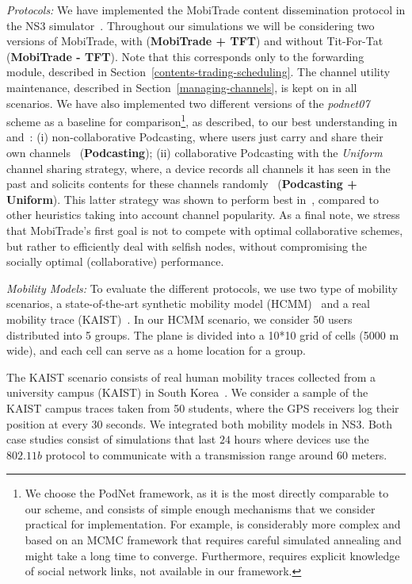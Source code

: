 \emph{Protocols:} We have implemented the MobiTrade content dissemination protocol in the NS3 simulator~\cite{NS3}. Throughout our simulations we will be considering two versions of MobiTrade, with (\textbf{MobiTrade + TFT}) and without Tit-For-Tat (\textbf{MobiTrade - TFT}). Note that this corresponds only to the forwarding module, described in Section~\ref{contents-trading-scheduling}. The channel utility maintenance, described in Section~\ref{managing-channels}, is kept on in all scenarios. We have also implemented two different versions of the \emph{podnet07} scheme as a baseline for comparison\footnote{We choose the PodNet framework, as it is the most directly comparable to our scheme, and consists of simple enough mechanisms that we consider practical for implementation. For example, \cite{OptimalChannelChoice} is considerably more complex and based on an MCMC framework that requires careful simulated annealing and might take a long time to converge. Furthermore, \cite{ContentPlace} requires explicit knowledge of social network links, not available in our framework.},  as described, to our best understanding in~\cite{May07wirelessopportunistic} and~\cite{Podcasting:Secon07}: (i) non-collaborative Podcasting, where users just carry and share their own channels~\cite{May07wirelessopportunistic} (\textbf{Podcasting}); (ii) collaborative Podcasting with the \emph{Uniform} channel sharing strategy, where, a device records all channels it has seen in the past and solicits contents for these channels randomly~\cite{Podcasting:Secon07} (\textbf{Podcasting + Uniform}). This latter strategy was shown to perform best in~\cite{Podcasting:Secon07}, compared to other heuristics taking into account channel popularity. As a final note, we stress that MobiTrade's first goal is not to compete with optimal collaborative schemes, but rather to efficiently deal with selfish nodes, without compromising the socially optimal (collaborative) performance.

\emph{Mobility Models:} To evaluate the different protocols, we use two type of mobility scenarios, a state-of-the-art synthetic mobility model (HCMM)~\cite{HCMM} and a real mobility trace (KAIST)~\cite{KAIST}. In our HCMM scenario, we consider 50 users distributed into 5 groups. The plane is divided into a 10*10 grid of cells (5000 m wide), and each cell can serve as a home location for a group.

The KAIST scenario consists of real human mobility traces collected from a university campus (KAIST) in South Korea~\cite{KAIST}. We consider a sample of the KAIST campus traces taken from 50 students, where the GPS receivers log their position at every $30$ seconds. We integrated both mobility models in NS3. Both case studies consist of simulations that last $24$ hours where devices use the $802.11b$ protocol to communicate with a transmission range around $60$ meters.

